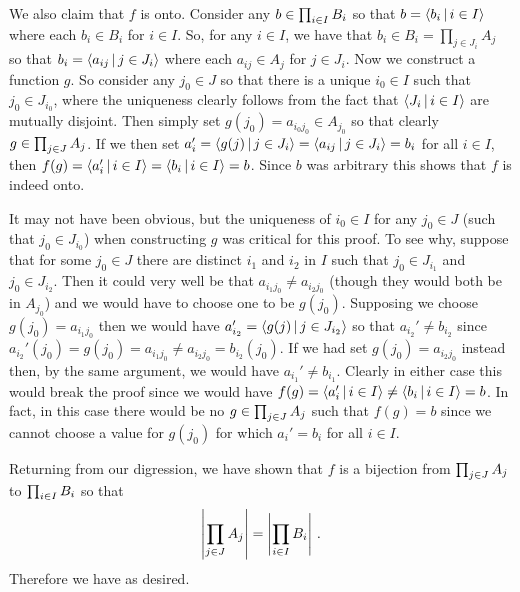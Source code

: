 {{    We also claim that $f$ is onto.
    Consider any $b \in \prodi B_i$ so that $b = \angles{b_i \where i \in I}$ where each $b_i \in B_i$ for $i \in I$.
    So, for any $i \in I$, we have that $b_i \in B_i = \prod_{j \in J_i} A_j$ so that $b_i = \angles{a_{ij} \where j \in J_i}$ where each $a_{ij} \in A_j$ for $j \in J_i$.
    Now we construct a function $g$.
    So consider any $j_0 \in J$ so that there is a unique $i_0 \in I$ such that $j_0 \in J_{i_0}$, where the uniqueness clearly follows from the fact that $\angles{J_i \where i \in I}$ are mutually disjoint.
    Then simply set $g(j_0) = a_{i_0 j_0} \in A_{j_0}$ so that clearly $g \in \prodj A_j$.
    If we then set $a_i' = \angles{g(j) \where j \in J_i} = \angles{a_{ij} \where j \in J_i} = b_i$ for all $i \in I$, then $f(g) = \angles{a_i' \where i \in I} = \angles{b_i \where i \in I} = b$.
    Since $b$ was arbitrary this shows that $f$ is indeed onto.

    It may not have been obvious, but the uniqueness of $i_0 \in I$ for any $j_0 \in J$ (such that $j_0 \in J_{i_0}$) when constructing $g$ was critical for this proof.
    To see why, suppose that for some $j_0 \in J$ there are distinct $i_1$ and $i_2$ in $I$ such that $j_0 \in J_{i_1}$ and $j_0 \in J_{i_2}$.
    Then it could very well be that $a_{i_1 j_0} \neq a_{i_2 j_0}$ (though they would both be in $A_{j_0}$) and we would have to choose one to be $g(j_0)$.
    Supposing we choose $g(j_0) = a_{i_1 j_0}$ then we would have $a_{i_2}' = \angles{g(j) \where j \in J_{i_2}}$ so that $a_{i_2}' \neq b_{i_2}$ since $a_{i_2}'(j_0) = g(j_0) = a_{i_1 j_0} \neq a_{i_2 j_0} = b_{i_2}(j_0)$.
    If we had set $g(j_0) = a_{i_2 j_0}$ instead then, by the same argument, we would have $a_{i_1}' \neq b_{i_1}$.
    Clearly in either case this would break the proof since we would have $f(g) = \angles{a_i' \where i \in I} \neq \angles{b_i \where i \in I} = b$.
    In fact, in this case there would be no $g \in \prodj A_j$ such that $f(g) = b$ since we cannot choose a value for $g(j_0)$ for which $a_i' = b_i$ for all $i \in I$.
    
    Returning from our digression, we have shown that $f$ is a bijection from $\prodj A_j$ to $\prodi B_i$ so that
    \begin{gather}
      \abs{\prodj A_j} = \abs{\prodi B_i} \,. \label{eqn:infsp:pJpI}
    \end{gather}
    Therefore we have
    as desired.
  }
}

